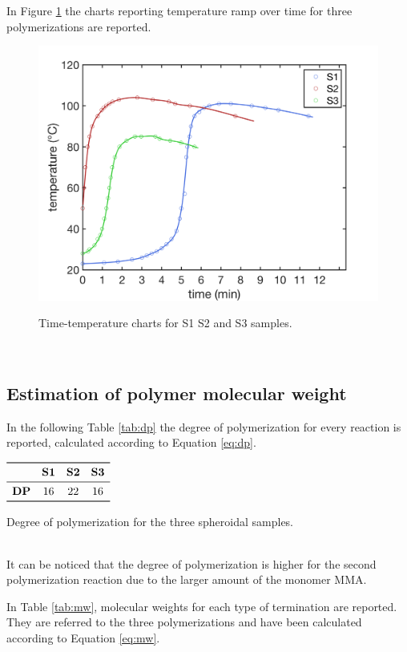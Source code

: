 \documentclass[a4paper, 11pt]{article}
\begin{document}
In Figure \ref{fig:Tt} the charts reporting temperature ramp over time for three polymerizations are reported. 
\begin{figure}[htp]
\centering
{\includegraphics[scale=0.35]{heatrelease}}
\captionsetup{justification=centering}
\caption{Time-temperature charts for S1 S2 and S3 samples.}
\label{fig:Tt}
\end{figure}\\

\newpage

\subsection{Estimation of polymer molecular weight}

In the following Table \ref{tab:dp} the degree of polymerization for every reaction is reported, calculated according to Equation \ref{eq:dp}.
\begin{table}[htp]
\centering
$
\begin{array}{cccc}
\toprule
& \textbf{S1} & \textbf{S2} & \textbf{S3}  \\
\midrule
\textbf{DP} & 16 & 22 & 16 \\
\bottomrule
\end{array}
$
\caption{Degree of polymerization for the three spheroidal samples.}
\label{tab:dp}
\end{table}\\
It can be noticed that the degree of polymerization is higher for the second polymerization reaction due to the larger amount of the monomer MMA.

In Table \ref{tab:mw}, molecular weights for each type of termination are reported. They are referred to the three polymerizations and have been calculated according to Equation \ref{eq:mw}.
\end{document}
